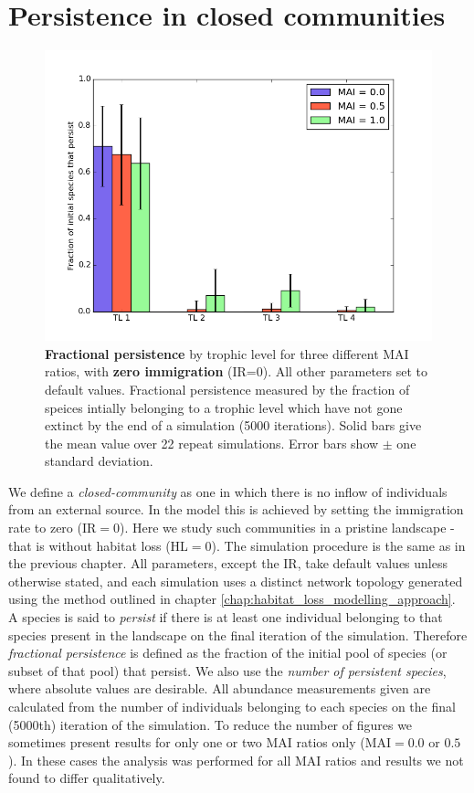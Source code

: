 \section{Persistence in closed communities}
\label{sec:closed_communities}

\begin{figure}
	\centering
	\includegraphics[width=0.8\linewidth]{"figures/persistence/hist_species_per_tl_zeroIR"}
	\caption{\textbf{Fractional persistence} by trophic level for three different MAI ratios, with \textbf{zero immigration} (IR=0). All other parameters set to default values. Fractional persistence measured by the fraction of speices intially belonging to a trophic level which have not gone extinct by the end of a simulation (5000 iterations). Solid bars give the mean value over 22 repeat simulations. Error bars show $\pm$ one standard deviation.}
	\label{fig:mvp_hist_zeroIR}
\end{figure}

We define a \emph{closed-community} as one in which there is no inflow of individuals from an external source. In the model this is achieved by setting the immigration rate to zero (IR$=0$). Here we study such communities in a pristine landscape - that is without habitat loss (HL$=0$). The simulation procedure is the same as in the previous chapter. All parameters, except the IR, take default values unless otherwise stated, and each simulation uses a distinct network topology generated using the method outlined in chapter \ref{chap:habitat_loss_modelling_approach}. A species is said to \emph{persist} if there is at least one individual belonging to that species present in the landscape on the final iteration of the simulation. Therefore \emph{fractional persistence} is defined as the fraction of the initial pool of species (or subset of that pool) that persist. We also use the \emph{number of persistent species}, where absolute values are desirable. All abundance measurements given are calculated from the number of individuals belonging to each species on the final (5000th) iteration of the simulation. To reduce the number of figures we sometimes present results for only one or two MAI ratios only (MAI$=0.0$ or $0.5$). In these cases the analysis was performed for all MAI ratios and results we not found to differ qualitatively.


